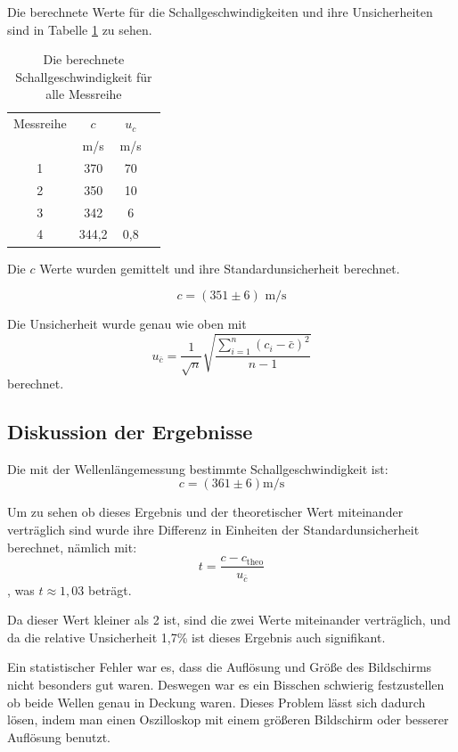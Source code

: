 \documentclass[11pt,a4paper]{article}
\begin{document}
Die berechnete Werte für die Schallgeschwindigkeiten und ihre Unsicherheiten sind in Tabelle \ref{Table2} zu sehen.

\begin{table}[h]
	\centering
	\begin{tabular*}{0.50\textwidth}{@{\extracolsep{\fill}}cccc}
		\toprule
		Messreihe & $c$ & $u_c$ \\
		& m/s&m/s\\
		1 & 370 & 70 \\
		2 & 350 & 10 \\
		3 & 342 & 6 \\
		4 & 344,2 & 0,8 \\
		\bottomrule
	\end{tabular*}
	\caption{Die berechnete Schallgeschwindigkeit für alle Messreihe}
\label{Table2}
\end{table}

Die $c$ Werte wurden gemittelt und ihre Standardunsicherheit berechnet. 

$$ c = (351 \pm 6) \textrm{ m/s}$$

Die Unsicherheit wurde genau wie oben mit
$$u_{\bar{c}} = \frac{1}{\sqrt{n}} \sqrt{\frac{\sum_{i=1}^{n}(c_i-\bar{c})^2}{n-1}}$$
berechnet. 




\subsection{Diskussion der Ergebnisse}


Die mit der Wellenlängemessung bestimmte Schallgeschwindigkeit ist:
$$ c = (361 \pm 6) \textrm{m/s} $$

Um zu sehen ob dieses Ergebnis und der theoretischer Wert miteinander verträglich sind wurde ihre Differenz in Einheiten der Standardunsicherheit berechnet, nämlich mit:
$$ t = \frac{c - c_\textrm{theo}}{u_{\bar{c}}} $$
, was $t \approx 1,03 $ beträgt. 
	
Da dieser Wert kleiner als 2 ist, sind die zwei Werte miteinander verträglich, und da die relative Unsicherheit 1,7\% ist dieses Ergebnis auch signifikant. 

Ein statistischer Fehler war es, dass die Auflösung und Größe des Bildschirms nicht besonders gut waren. Deswegen war es ein Bisschen schwierig festzustellen ob beide Wellen genau in Deckung waren. Dieses Problem lässt sich dadurch lösen, indem man einen Oszilloskop mit einem größeren Bildschirm oder besserer Auflösung benutzt. 
\end{document}
